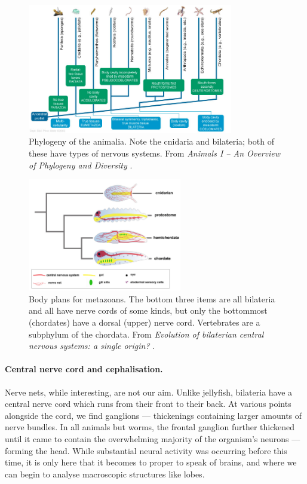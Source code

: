 \begin{figure}
	\centering
	\includegraphics[width=0.8\textwidth]{Figs/animalia.jpg}
	\caption{Phylogeny of the animalia. Note the cnidaria and bilateria; both of these have types of nervous systems. From {\em Animals I -- An Overview of Phylogeny and Diversity} \cite{animalia}.}
	\label{fig:animalia}
\end{figure}

\begin{figure}
	\centering
	\includegraphics[width=0.6\textwidth]{Figs/chordata.jpg}
	\caption{Body plans for metazoans. The bottom three items are all bilateria and all have nerve cords of some kinds, but only the bottommost (chordates) have a dorsal (upper) nerve cord. Vertebrates are a subphylum of the chordata. From {\em Evolution of bilaterian central nervous systems: a single origin?} \cite[p.\ 3]{chordata}.}
	\label{fig:chordata}
\end{figure}

\paragraph{Central nerve cord and cephalisation.} Nerve nets, while interesting, are not our aim. Unlike jellyfish, bilateria have a central nerve cord which runs from their front to their back. At various points alongside the cord, we find ganglions --- thickenings containing larger amounts of nerve bundles. In all animals but worms, the frontal ganglion further thickened until it came to contain the overwhelming majority of the organism's neurons --- forming the head. While substantial neural activity was occurring before this time, it is only here that it becomes to proper to speak of brains, and where we can begin to analyse macroscopic structures like lobes.

